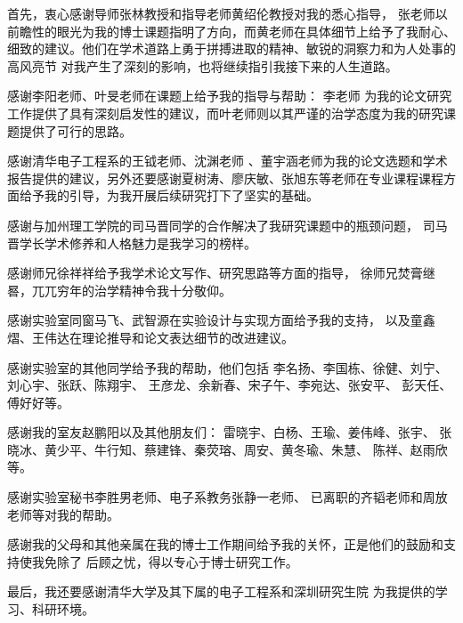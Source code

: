 
\begin{acknowledgements}
  首先，衷心感谢导师张林教授和指导老师黄绍伦教授对我的悉心指导，
  张老师以前瞻性的眼光为我的博士课题指明了方向，而黄老师在具体细节上给予了我耐心、
  细致的建议。他们在学术道路上勇于拼搏进取的精神、敏锐的洞察力和为人处事的高风亮节
  对我产生了深刻的影响，也将继续指引我接下来的人生道路。

  感谢李阳老师、叶旻老师在课题上给予我的指导与帮助：
  李老师 为我的论文研究工作提供了具有深刻启发性的建议，而叶老师则以其严谨的治学态度为我的研究课题提供了可行的思路。

 感谢清华电子工程系的王钺老师、沈渊老师 、董宇涵老师为我的论文选题和学术报告提供的建议，另外还要感谢夏树涛、廖庆敏、张旭东等老师在专业课程课程方面给予我的引导，为我开展后续研究打下了坚实的基础。
 
 感谢与加州理工学院的司马晋同学的合作解决了我研究课题中的瓶颈问题，
 司马晋学长学术修养和人格魅力是我学习的榜样。
 
 感谢师兄徐祥祥给予我学术论文写作、研究思路等方面的指导，
 徐师兄焚膏继晷，兀兀穷年的治学精神令我十分敬仰。
 
感谢实验室同窗马飞、武智源在实验设计与实现方面给予我的支持，
以及童鑫熠、王伟达在理论推导和论文表达细节的改进建议。

感谢实验室的其他同学给予我的帮助，他们包括
李名扬、李国栋、徐健、刘宁、刘心宇、张跃、陈翔宇、
王彦龙、余新春、宋子午、李宛达、张安平、
彭天任、傅好好等。

感谢我的室友赵鹏阳以及其他朋友们：
雷晓宇、白杨、王瑜、姜伟峰、张宇、
张晓冰、黄少平、牛行知、蔡建锋、秦荧瑢、周安、黄冬瑜、朱慧、
陈祥、赵雨欣等。

感谢实验室秘书李胜男老师、电子系教务张静一老师、
已离职的齐韬老师和周放老师等对我的帮助。

感谢我的父母和其他亲属在我的博士工作期间给予我的关怀，正是他们的鼓励和支持使我免除了
后顾之忧，得以专心于博士研究工作。

最后，我还要感谢清华大学及其下属的电子工程系和深圳研究生院
为我提供的学习、科研环境。
\end{acknowledgements}
